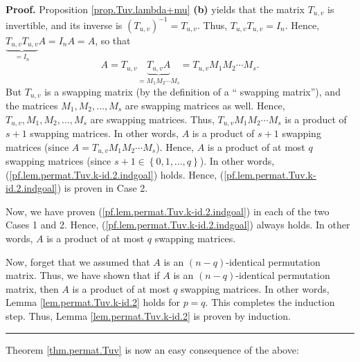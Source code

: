 \documentclass[numbers=enddot,12pt,final,onecolumn,notitlepage]{scrartcl}%
\theoremstyle{definition}
\newenvironment{proof}[1][Proof]{\noindent\textbf{#1.} }{\ \rule{0.5em}{0.5em}}
\begin{document}
\begin{proof}
Proposition \ref{prop.Tuv.lambda+mu} \textbf{(b)} yields that the matrix
$T_{u,v}$ is invertible, and its inverse is $\left(  T_{u,v}\right)
^{-1}=T_{u,v}$. Thus, $T_{u,v}T_{u,v}=I_{n}$. Hence, $\underbrace{T_{u,v}%
T_{u,v}}_{=I_{n}}A=I_{n}A=A$, so that%
\[
A=T_{u,v}\underbrace{T_{u,v}A}_{=M_{1}M_{2}\cdots M_{s}}=T_{u,v}M_{1}%
M_{2}\cdots M_{s}.
\]
But $T_{u,v}$ is a swapping matrix (by the definition of a \textquotedblleft
swapping matrix\textquotedblright), and the matrices $M_{1},M_{2},\ldots
,M_{s}$ are swapping matrices as well. Hence, $T_{u,v},M_{1},M_{2}%
,\ldots,M_{s}$ are swapping matrices. Thus, $T_{u,v}M_{1}M_{2}\cdots M_{s}$ is
a product of $s+1$ swapping matrices. In other words, $A$ is a product of
$s+1$ swapping matrices (since $A=T_{u,v}M_{1}M_{2}\cdots M_{s}$). Hence, $A$
is a product of at most $q$ swapping matrices (since $s+1\in\left\{
0,1,\ldots,q\right\}  $). In other words,
(\ref{pf.lem.permat.Tuv.k-id.2.indgoal}) holds. Hence,
(\ref{pf.lem.permat.Tuv.k-id.2.indgoal}) is proven in Case 2.

Now, we have proven (\ref{pf.lem.permat.Tuv.k-id.2.indgoal}) in each of the
two Cases 1 and 2. Hence, (\ref{pf.lem.permat.Tuv.k-id.2.indgoal}) always
holds. In other words, $A$ is a product of at most $q$ swapping matrices.

Now, forget that we assumed that $A$ is an $\left(  n-q\right)  $-identical
permutation matrix. Thus, we have shown that if $A$ is an $\left(  n-q\right)
$-identical permutation matrix, then $A$ is a product of at most $q$ swapping
matrices. In other words, Lemma \ref{lem.permat.Tuv.k-id.2} holds for $p=q$.
This completes the induction step. Thus, Lemma \ref{lem.permat.Tuv.k-id.2} is
proven by induction.
\end{proof}

Theorem \ref{thm.permat.Tuv} is now an easy consequence of the above:
\end{document}
